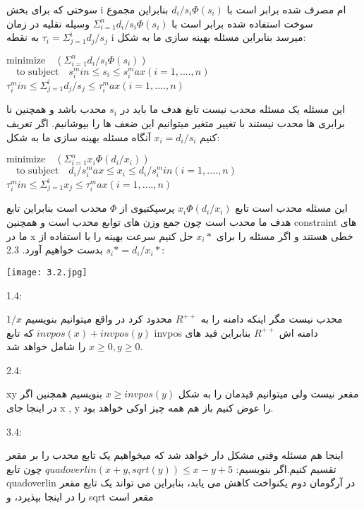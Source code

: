 سوختی که برای بخش i ام مصرف شده برابر است با
$ d_i / s_i \Phi(s_i) $
بنابراین مجموع سوخت استفاده شده برابر است با 
$ \Sigma_{i=1}^{n}d_i / s_i \Phi(s_i) $
وسیله نقلیه در زمان 
$ \tau_i = \Sigma_{j=1}^{i}d_j / s_j $
به نقطه i میرسد بنابراین مسئله بهینه سازی ما به شکل:
\begin{center}
$ \text{minimize}\quad \left(\Sigma_{i=1}^{n}d_i / s_i \Phi(s_i)\right) $\\
$ \quad \text{to subject} \quad s_i^min \leq s_i \leq s_i^max (i = 1,....,n) $\\
$ \tau_i^min \leq \Sigma_{j=1}^{i}d_j / s_j \leq \tau_i^max (i = 1,....,n) $\\
\end{center}
 این مسئله یک مسئله محدب نیست تابغ هدف ما باید در $ s_i $ محدب باشد و همچنین نا برابری ها محدب نیستند با تغییر متغیر میتوانیم این ضعف ها را بپوشانیم. اگر تعریف کنیم 
$ x_i = d_i / s_i $
آنگاه مسئله بهینه سازی ما به شکل:
\begin{center}
$ \text{minimize}\quad \left(\Sigma_{i=1}^{n}x_i \Phi(d_i/x_i)\right) $\\
$ \quad \text{to subject} \quad d_i/s_i^max \leq x_i \leq d_i/s_i^min (i = 1,....,n) $\\
$ \tau_i^min \leq \Sigma_{j=1}^{i}x_j \leq \tau_i^max (i = 1,....,n) $\\
\end{center}
این مسئله محدب است تابع 
$ x_i \Phi(d_i/x_i) $
پرسپکتیوی از $ \Phi $ محدب است بنابراین تابع هدف ما محدب است چون جمع وزن های توابع محدب است و همچنین constraint های ما در x خطی هستند و اگر مسئله را برای 
$ x_i* $
حل کنیم سرعت بهینه را با استفاده از 
$ s_i* = d_i/x_i* $
بدست خواهیم آورد.
2.3:

\begin{center}
    \texttt{[image: 3.2.jpg]}
\end{center}

1.4:

$1/x$
محدب نیست مگر اینکه دامنه را به 
$ R^{++} $ 
محدود کرد در واقع میتوانیم بنویسیم 
$ invpos(x) + invpos(y) $ 
که تابع invpos دامنه اش
$ R^{++} $ 
بنابراین قید های 
$ x \ge 0 , y \ge 0 $ 
را شامل خواهد شد.

2.4:

xy
مقعر نیست ولی میتوانیم قیدمان را به شکل
$  x \geq invpos(y) $
بنویسیم همچنین اگر در اینجا جای x , y را عوض کنیم باز هم همه چیز اوکی خواهد بود.

3.4:

اینجا هم مسئله وقتی مشکل دار خواهد شد که میخواهیم یک تابع محدب را بر مقعر تقسیم کنیم.اگر بنویسیم:
$ quadoverlin(x + y , sqrt(y)) \leq x - y + 5 $
چون تابع quadoverlin در آرگومان دوم یکنواخت کاهش می یابد، بنابراین می تواند یک تابع مقعر را در اینجا بپذیرد، و sqrt مقعر است

